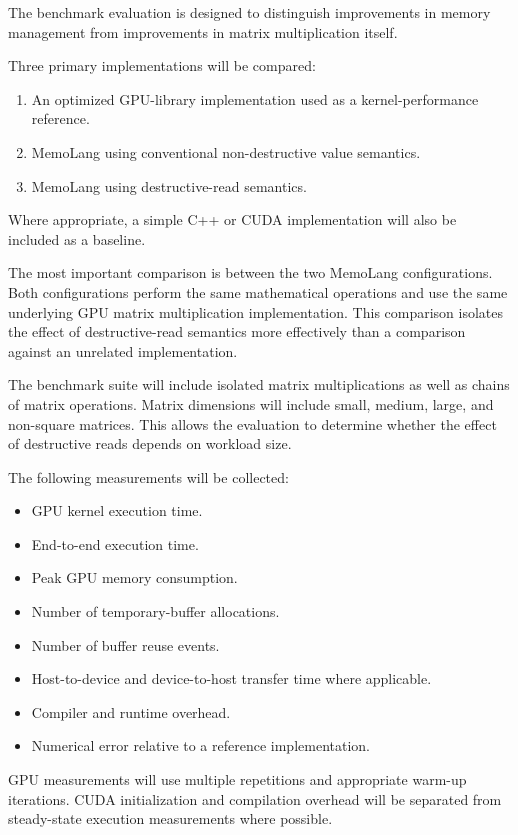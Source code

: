 \documentclass[a4paper]{article}
\begin{document}
The benchmark evaluation is designed to distinguish improvements in memory management from improvements in matrix multiplication itself.

Three primary implementations will be compared:

\begin{enumerate}
\item An optimized GPU-library implementation used as a kernel-performance reference.
\item MemoLang using conventional non-destructive value semantics.
\item MemoLang using destructive-read semantics.
\end{enumerate}

Where appropriate, a simple C++ or CUDA implementation will also be included as a baseline.

The most important comparison is between the two MemoLang configurations. Both configurations perform the same mathematical operations and use the same underlying GPU matrix multiplication implementation. This comparison isolates the effect of destructive-read semantics more effectively than a comparison against an unrelated implementation.

The benchmark suite will include isolated matrix multiplications as well as chains of matrix operations. Matrix dimensions will include small, medium, large, and non-square matrices. This allows the evaluation to determine whether the effect of destructive reads depends on workload size.

The following measurements will be collected:

\begin{itemize}
\item GPU kernel execution time.
\item End-to-end execution time.
\item Peak GPU memory consumption.
\item Number of temporary-buffer allocations.
\item Number of buffer reuse events.
\item Host-to-device and device-to-host transfer time where applicable.
\item Compiler and runtime overhead.
\item Numerical error relative to a reference implementation.
\end{itemize}

GPU measurements will use multiple repetitions and appropriate warm-up iterations. CUDA initialization and compilation overhead will be separated from steady-state execution measurements where possible.
\end{document}
